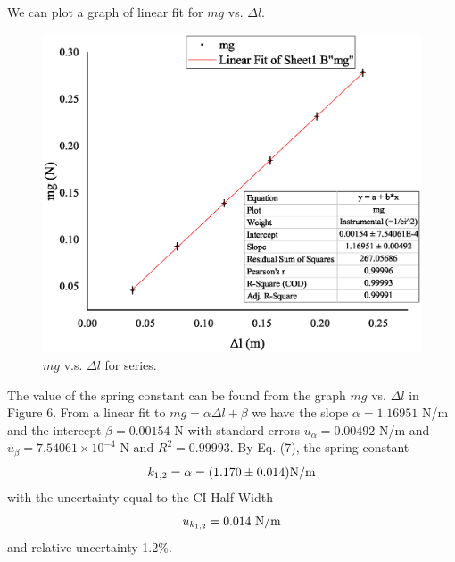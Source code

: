 \documentclass[a4paper]{report}
\begin{document}
	We can plot a graph of linear fit for $mg$ vs. $\Delta l$.
	\begin{figure}[H]
		\centering
		\includegraphics[width=1\linewidth]{7.eps}
		\caption{$mg$ v.s. $\Delta l$ for series.}
	\end{figure}
	The value of the spring constant can be found from the graph $mg$ vs. $\Delta l$ in Figure 6. From a linear fit to $mg=\alpha\Delta l+\beta$ we have the slope $\alpha=1.16951$ N/m and the intercept $\beta=0.00154$ N with standard errors $u_{\alpha}=0.00492$ N/m and $u_{\beta}=7.54061\times10^{-4}$ N and $R^2=0.99993$. By Eq. (7), the spring constant
	\begin{equation*}
	k_{1,2}=\alpha=(1.170\pm0.014)\rm{N/m}
	\end{equation*}
	with the uncertainty equal to the CI Half-Width
	\begin{equation*}
	u_{k_{1,2}}=0.014\ \rm{N/m}
	\end{equation*}
	and relative uncertainty 1.2\%.
\end{document}
